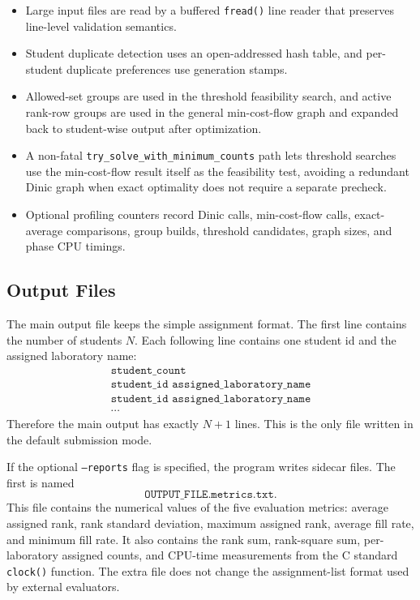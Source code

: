 \documentclass[11pt,a4paper]{article}
\begin{document}
\begin{itemize}[leftmargin=2em]
  \item Large input files are read by a buffered \texttt{fread()} line reader
        that preserves line-level validation semantics.
  \item Student duplicate detection uses an open-addressed hash table, and
        per-student duplicate preferences use generation stamps.
  \item Allowed-set groups are used in the threshold feasibility search, and
        active rank-row groups are used in the general min-cost-flow graph and
        expanded back to student-wise output after optimization.
  \item A non-fatal \texttt{try\_solve\_with\_minimum\_counts} path lets
        threshold searches use the min-cost-flow result itself as the
        feasibility test, avoiding a redundant Dinic graph when exact
        optimality does not require a separate precheck.
  \item Optional profiling counters record Dinic calls, min-cost-flow calls,
        exact-average comparisons, group builds, threshold candidates, graph
        sizes, and phase CPU timings.
\end{itemize}

\subsection{Output Files}

The main output file keeps the simple assignment format.  The
first line contains the number of students \(N\).  Each following line
contains one student id and the assigned laboratory name:
\[
\begin{array}{l}
\texttt{student\_count}\\
\texttt{student\_id assigned\_laboratory\_name}\\
\texttt{student\_id assigned\_laboratory\_name}\\
\cdots
\end{array}
\]
Therefore the main output has exactly \(N+1\) lines.  This is the only file
written in the default submission mode.

If the optional \texttt{--reports} flag is specified, the program writes
sidecar files.  The first is named
\[
  \texttt{OUTPUT\_FILE.metrics.txt}.
\]
This file contains the numerical values of the five evaluation metrics:
average assigned rank, rank standard deviation, maximum assigned rank,
average fill rate, and minimum fill rate.  It also contains the rank sum,
rank-square sum, per-laboratory assigned counts, and CPU-time measurements
from the C standard \texttt{clock()} function.  The extra file does not change
the assignment-list format used by external evaluators.
\end{document}
